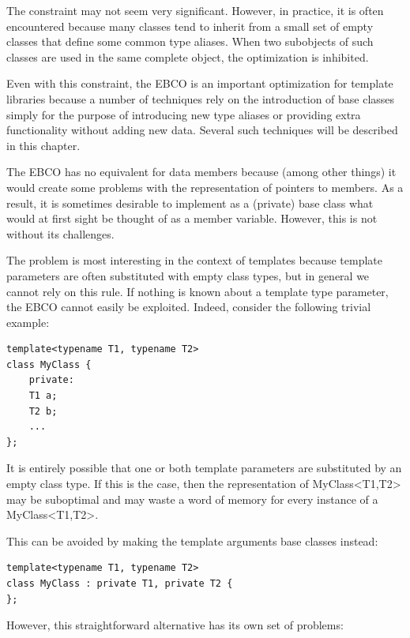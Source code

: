 The constraint may not seem very significant. However, in practice, it is often encountered because many classes tend to inherit from a small set of empty classes that define some common type aliases. When two subobjects of such classes are used in the same complete object, the optimization is inhibited.

Even with this constraint, the EBCO is an important optimization for template libraries because a number of techniques rely on the introduction of base classes simply for the purpose of introducing new type aliases or providing extra functionality without adding new data. Several such techniques will be described in this chapter.


The EBCO has no equivalent for data members because (among other things) it would create some problems with the representation of pointers to members. As a result, it is sometimes desirable to implement as a (private) base class what would at first sight be thought of as a member variable. However, this is not without its challenges.

The problem is most interesting in the context of templates because template parameters are often substituted with empty class types, but in general we cannot rely on this rule. If nothing is known about a template type parameter, the EBCO cannot easily be exploited. Indeed, consider the following trivial example:

\begin{lstlisting}[style=styleCXX]
template<typename T1, typename T2>
class MyClass {
	private:
	T1 a;
	T2 b;
	...
};
\end{lstlisting}

It is entirely possible that one or both template parameters are substituted by an empty class type. If this is the case, then the representation of MyClass<T1,T2> may be suboptimal and may waste a word of memory for every instance of a MyClass<T1,T2>.

This can be avoided by making the template arguments base classes instead:

\begin{lstlisting}[style=styleCXX]
template<typename T1, typename T2>
class MyClass : private T1, private T2 {
};
\end{lstlisting}

However, this straightforward alternative has its own set of problems:

